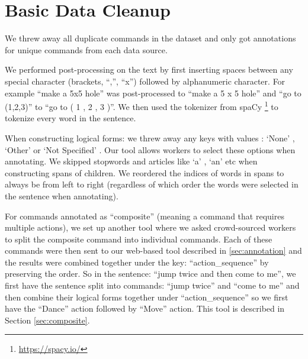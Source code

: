 \section{Basic Data Cleanup}
\label{sec:data_cleanup}
We threw away all duplicate commands in the dataset and only got annotations for unique commands from each data source.

We performed post-processing on the text by first inserting spaces between any special character (brackets, ``,'', ``x'') followed by alphanumeric character. For example ``make a 5x5 hole'' was post-processed to ``make a 5 x 5 hole'' and ``go to (1,2,3)'' to ``go to ( 1 , 2 , 3 )''. We then used the tokenizer from spaCy \footnote{\url{https://spacy.io/}}  to tokenize every word in the sentence.

When constructing logical forms: we threw away any keys with values : `None' , `Other' or `Not Specified' . Our tool allows workers to select these options when annotating. We skipped stopwords and articles like `a' , `an' etc when constructing spans of children. We reordered the indices of words in spans to always be from left to right (regardless of which order the words were selected in the sentence when annotating).

For commands annotated as ``composite'' (meaning a command that requires multiple actions), we set up another tool where we asked crowd-sourced workers to split the composite command into individual commands. Each of these commands were then sent to our web-based tool described in \ref{sec:annotation} and the results were combined together under the key: ``action\_sequence'' by preserving the order. So in the sentence: ``jump twice and then come to me'', we first have the sentence split into commands: ``jump twice'' and ``come to me'' and then combine  their logical forms together under ``action\_sequence'' so we first have the ``Dance'' action followed by ``Move'' action. This tool is described in Section \ref{sec:composite}.